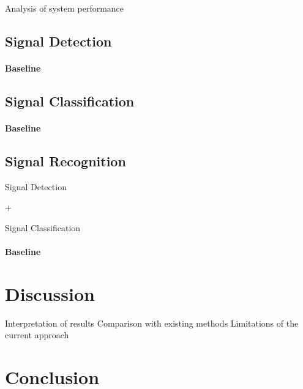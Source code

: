 \documentclass[english, ing, kiv, he, iso690alph, pdf, viewonly]{fasthesis}
\begin{document}
Analysis of system performance


\section{Signal Detection}

\subsubsection{Baseline}


\section{Signal Classification}


\subsubsection{Baseline}


\section{Signal Recognition}


Signal Detection


+


Signal Classification


\subsubsection{Baseline}


\chapter{Discussion}

Interpretation of results
Comparison with existing methods
Limitations of the current approach





\chapter{Conclusion}






\end{document}
